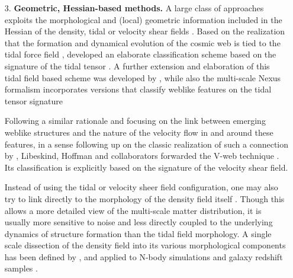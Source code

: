 \begin{itemize}
\item[3.] {\bf Geometric, Hessian-based methods.} A large class of approaches exploits the morphological and (local) geometric  information included in the Hessian of the density, tidal or velocity shear fields
\citep[e.g.][]{Aragon-Calvo2007,Hahn2007,Forero-Romero2009a,Bond2010a,Cautun2013}. Based on the realization that the formation and 
dynamical evolution of the cosmic web is tied to the tidal force field \citep[see][]{Bond1996}, \cite{Hahn2007} 
developed an elaborate classification scheme based on the signature of the tidal tensor \citep[also see][]{Hahn2007b}. 
A further extension and elaboration of this tidal field based scheme was developed by \cite{Forero-Romero2009a}, while also the 
multi-scale Nexus formalism incorporates versions that classify weblike features on the tidal tensor signature \citep[][see below]{Cautun2013}

Following a similar rationale and focusing on the link between emerging weblike structures and the nature of the 
velocity flow in and around these features, in a sense following up on the classic realization of such a connection by \cite{Zeldovich1970}, 
Libeskind, Hoffman and collaborators forwarded the V-web technique \citep{Hoffman2012a, Forero-Romero2009a, Libeskind2013}. Its classification is explicitly based on the 
signature of the velocity shear field. 

Instead of using the tidal or velocity sheer field configuration, one may also try to link directly to the morphology of the density field itself 
\citep{Aragon-Calvo2007,Bond2010a,Cautun2013}. Though this allows a more detailed view of the  multi-scale matter distribution, it 
is usually more sensitive to noise and less directly coupled to the underlying dynamics of structure formation than the tidal field morphology. 
A single scale dissection of the density field into its various morphological components has been defined by \cite{Bond2010a}, and applied to N-body 
simulations and galaxy redshift samples \citep[also see][]{Bond2010a,Bond2010b,Choi2010}. 


\end{itemize}

